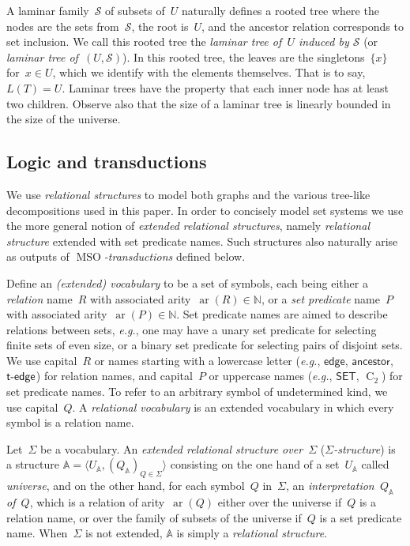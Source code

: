 \documentclass{lmcs} %
\newcommand*\defd[2][\em\color{red!25!black}]{{#1#2}}
\newcommand{\arity}{\operatorname{ar}}
\newcommand{\MSO}{\ensuremath{\operatorname{MSO}}\xspace}
\newcommand{\C}[1][]{\ensuremath{\operatorname{C}_{#1}}\xspace}
\newcommand{\ancestor}{\mathsf{ancestor}}
\newcommand{\edge}{\ensuremath{\mathsf{edge}}\xspace}
\newcommand{\tedge}{\ensuremath{\mathsf{t}\text-\mathsf{edge}}\xspace}
\newcommand{\SET}{\ensuremath{\mathsf{SET}}\xspace}
\def\eg{{\em e.g.}}
\begin{document}
A laminar family~$\mathcal{S}$ of subsets of~$U$
naturally defines a rooted tree
where the nodes are the sets from~$\mathcal{S}$,
the root is~$U$,
and the ancestor relation corresponds to set inclusion.
We call this rooted tree
the \defd{laminar tree of~$U$ induced by $\mathcal{S}$}
(or \defd{laminar tree of~$(U,\mathcal{S})$}).\xspace
In this rooted tree,
the leaves are the singletons~$\{x\}$ for~$x\in U$,
which we identify with the elements themselves.
That is to say, $L(T)=U$.
Laminar trees have the property
that each inner node has at least two children.
Observe also that the size of a laminar tree
is linearly bounded in the size of the universe.

\subsection{Logic and transductions}
We use \emph{relational structures} to model
both graphs and the various tree-like decompositions used in this paper.
In order to concisely model set systems
we use the more general notion of \emph{extended relational structures},
namely \emph{relational structure} extended with set predicate names.
Such structures also naturally arise as outputs of \emph{\MSO-transductions} defined below.
\smallbreak

Define an \defd{(extended) vocabulary} to be a set of symbols,
each being either a \emph{relation} name~$R$ with associated arity~\defd{$\arity(R)\in\mathbb{N}$},
or a \emph{set predicate} name~$P$ with associated arity~\defd{$\arity(P)\in\mathbb{N}$}.
Set predicate names are aimed to describe relations between sets,
\eg, one may have a unary set predicate for selecting finite sets of even size,
or a binary set predicate for selecting pairs of disjoint sets.
We use capital~$R$ or
names starting with a lowercase letter (\eg, $\edge$, $\ancestor$, $\tedge$) for relation names,
and capital~$P$ or uppercase names (\eg, $\SET$, $\C[2]$) for set predicate names.
To refer to an arbitrary symbol of undetermined kind, we use capital~$Q$.
A \defd{relational vocabulary} is an extended vocabulary in which every symbol is a relation name.

Let~$\Sigma$ be a vocabulary.
An \defd{extended relational structure over~$\Sigma$} (\defd{$\Sigma$-structure})
is a structure $\mathbb{A}=\langle U_{\mathbb{A}}, (Q_{\mathbb{A}})_{Q\in \Sigma}\rangle$
consisting on the one hand of a set~\defd{$U_\mathbb{A}$} called \defd{universe},
and on the other hand, for each symbol~$Q$ in~$\Sigma$,
an \defd{interpretation~$Q_{\mathbb{A}}$ of~$Q$},
which is a relation of arity~$\arity(Q)$
either over the universe if~$Q$ is a relation name,
or over the family of subsets of the universe if~$Q$ is a set predicate name.
When~$\Sigma$ is not extended, $\mathbb{A}$ is simply a \defd{relational structure}.
\end{document}
